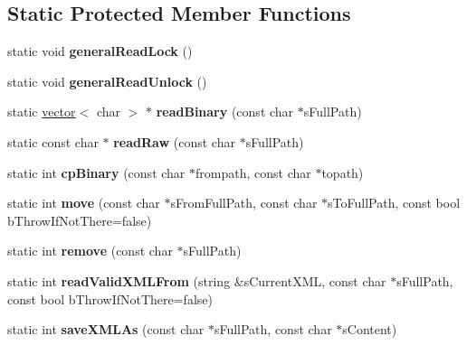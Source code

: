 \subsection*{\-Static \-Protected \-Member \-Functions}
\begin{DoxyCompactItemize}
\item 
\hypertarget{classgeneral__server_1_1IOFile_a6790b3d488fdf32d8fa1a40d5806689a}{static void {\bfseries general\-Read\-Lock} ()}\label{classgeneral__server_1_1IOFile_a6790b3d488fdf32d8fa1a40d5806689a}

\item 
\hypertarget{classgeneral__server_1_1IOFile_a4d52d6c840890c596273bbdb203a18eb}{static void {\bfseries general\-Read\-Unlock} ()}\label{classgeneral__server_1_1IOFile_a4d52d6c840890c596273bbdb203a18eb}

\item 
\hypertarget{classgeneral__server_1_1IOFile_a7b378b9b004cc827b2d3a3768fb442ec}{static \hyperlink{classvector}{vector}$<$ char $>$ $\ast$ {\bfseries read\-Binary} (const char $\ast$s\-Full\-Path)}\label{classgeneral__server_1_1IOFile_a7b378b9b004cc827b2d3a3768fb442ec}

\item 
\hypertarget{classgeneral__server_1_1IOFile_aa92c15037f0e3d4d02617e34f326cb18}{static const char $\ast$ {\bfseries read\-Raw} (const char $\ast$s\-Full\-Path)}\label{classgeneral__server_1_1IOFile_aa92c15037f0e3d4d02617e34f326cb18}

\item 
\hypertarget{classgeneral__server_1_1IOFile_ae9b63f05fcd51c3f5322da7ad1cea602}{static int {\bfseries cp\-Binary} (const char $\ast$frompath, const char $\ast$topath)}\label{classgeneral__server_1_1IOFile_ae9b63f05fcd51c3f5322da7ad1cea602}

\item 
\hypertarget{classgeneral__server_1_1IOFile_a464ddde03e848f7fec60467bb3d7798f}{static int {\bfseries move} (const char $\ast$s\-From\-Full\-Path, const char $\ast$s\-To\-Full\-Path, const bool b\-Throw\-If\-Not\-There=false)}\label{classgeneral__server_1_1IOFile_a464ddde03e848f7fec60467bb3d7798f}

\item 
\hypertarget{classgeneral__server_1_1IOFile_a78cba645ef591fa83f2f3e603dedefff}{static int {\bfseries remove} (const char $\ast$s\-Full\-Path)}\label{classgeneral__server_1_1IOFile_a78cba645ef591fa83f2f3e603dedefff}

\item 
\hypertarget{classgeneral__server_1_1IOFile_ace54577cb26057fdfbf7ccf11411f3ab}{static int {\bfseries read\-Valid\-X\-M\-L\-From} (string \&s\-Current\-X\-M\-L, const char $\ast$s\-Full\-Path, const bool b\-Throw\-If\-Not\-There=false)}\label{classgeneral__server_1_1IOFile_ace54577cb26057fdfbf7ccf11411f3ab}

\item 
\hypertarget{classgeneral__server_1_1IOFile_a9bb162abffe590ba31b2a9eba3daabc6}{static int {\bfseries save\-X\-M\-L\-As} (const char $\ast$s\-Full\-Path, const char $\ast$s\-Content)}\label{classgeneral__server_1_1IOFile_a9bb162abffe590ba31b2a9eba3daabc6}

\end{DoxyCompactItemize}
